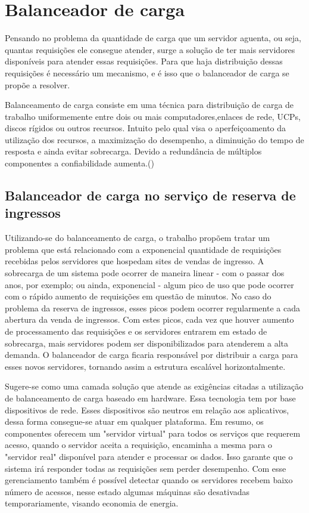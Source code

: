 \chapter{Balanceador de carga}\label{balanceador-de-carga}

Pensando no problema da quantidade de carga que um servidor aguenta, ou seja, quantas requisições ele consegue atender,
surge a solução de ter mais servidores disponíveis para atender essas requisições.
Para que haja distribuição dessas requisições é necessário um mecanismo, e é isso que o balanceador de carga se
propõe a resolver.

Balanceamento de carga consiste em uma técnica para distribuição de carga de trabalho uniformemente entre dois ou mais
computadores,enlaces de rede, UCPs, discos rígidos ou outros recursos. Intuito pelo qual visa o aperfeiçoamento da 
utilização dos recursos, a maximização do desempenho, a diminuição do tempo de resposta e ainda evitar sobrecarga.
Devido a redundância de múltiplos componentes a confiabilidade aumenta.(\cite{O-que-e-e-para-que-serve-o-balanceamento
-de-carga})


\section{Balanceador de carga no serviço de reserva de ingressos}

Utilizando-se do balanceamento de carga, o trabalho propõem tratar um problema que está relacionado com a exponencial
quantidade de requisições recebidas pelos servidores que hospedam sites de vendas de ingresso. A sobrecarga de um
sistema pode ocorrer de maneira linear - com o passar dos anos, por exemplo; ou ainda, exponencial - algum pico de uso
que pode ocorrer com o rápido aumento de requisições em questão de minutos.
No caso do problema da reserva de ingressos, esses picos podem ocorrer regularmente a cada abertura da venda de ingressos.
Com estes picos, cada vez que houver aumento de processamento das requisições e os servidores entrarem em
estado de sobrecarga, mais servidores podem ser disponibilizados para atenderem a alta demanda.
O balanceador de carga ficaria responsável por distribuir a carga para esses novos servidores,
tornando assim a estrutura escalável horizontalmente.

Sugere-se como uma camada solução que atende as exigências citadas a utilização de balanceamento de carga baseado 
em hardware.
Essa tecnologia tem por base dispositivos de rede. Esses dispositivos são neutros em relação aos aplicativos, dessa forma
consegue-se atuar em qualquer plataforma. Em resumo, os componentes oferecem um "servidor virtual" para todos os serviços
que requerem acesso, quando o servidor aceita a requisição, encaminha a mesma para o "servidor real" disponível para atender
e processar os dados.
Isso garante que o sistema irá responder todas as requisições sem perder desempenho.
Com esse gerenciamento também é possível detectar quando os servidores recebem baixo número de acessos, nesse
estado algumas máquinas são desativadas temporariamente, visando economia de energia.

